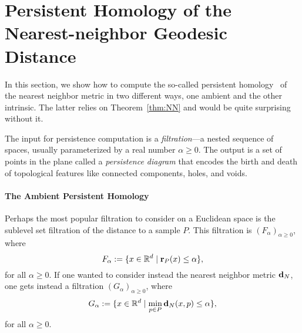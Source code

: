 \section{Persistent Homology of the Nearest-neighbor Geodesic Distance}
  \label{sec:persistence}

%
  In this section, we show how to compute the so-called persistent homology~\cite{edelsbrunner02topological} of the nearest neighbor metric in two different ways, one ambient and the other intrinsic.
  The latter relies on Theorem~\ref{thm:NN} and would be quite surprising without it.

  The input for persistence computation is a \emph{filtration}---a nested sequence of spaces, usually parameterized by a real number $\alpha\ge 0$.
  The output is a set of points in the plane called a \emph{persistence diagram} that encodes the birth and death of topological features like connected components, holes, and voids.

  \paragraph*{The Ambient Persistent Homology}

    Perhaps the most popular filtration to consider on a Euclidean space is the sublevel set filtration of the distance to a sample $P$.
    This filtration is $(F_\alpha)_{\alpha\ge 0}$, where
    \[
      F_\alpha := \{x\in {\mathbb R}^d \mid \mathbf{r}_P(x) \le \alpha\},
    \]
    for all $\alpha \ge 0$.
    If one wanted to consider instead the nearest neighbor metric $\mathbf{d}_N$, one gets instead a filtration $(G_\alpha)_{\alpha\ge 0}$, where
    \[
      G_\alpha := \{x\in {\mathbb R}^d \mid \min_{p \in P} \mathbf{d}_N(x,p) \le \alpha\},
    \]
    for all $\alpha \ge 0$.

